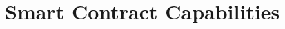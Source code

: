 \documentclass[12pt,a4paper]{report}
\begin{document}
%
%
%

\chapter{Smart Contract Capabilities}
\label{app:smart-contract-capabilities}
\end{document}
